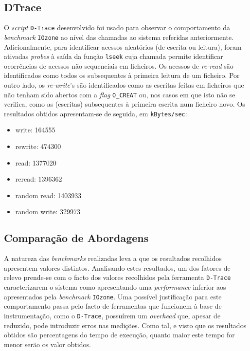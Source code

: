 \documentclass{article}
\begin{document}
\subsection{DTrace}
O \textit{script} \texttt{D-Trace} desenvolvido foi usado para observar o comportamento da \textit{benchmark} \texttt{IOzone} ao nível das chamadas
ao sistema referidas anteriormente. Adicionalmente, para identificar acessos aleatórios (de escrita ou leitura), foram ativadas \textit{probes} à
saída da função \texttt{lseek} cuja chamada permite identificar ocorrências de acessos não sequenciais em ficheiros. 
Os acessos de \textit{re-read} são identificados como todos os subsequentes à primeira leitura de um ficheiro. Por outro lado, os \textit{re-write}'s 
são identificados como as escritas feitas em ficheiros que não tenham sido abertos com a \textit{flag} \texttt{O\_CREAT} ou, nos casos em que isto não 
se verifica, como as (escritas) subsequentes à primeira escrita num ficheiro novo.
Os resultados obtidos apresentam-se de seguida, em \texttt{kBytes/sec}:
\begin{itemize}
    \item write: 164555
    \item rewrite: 474300
    \item read: 1377020
    \item reread: 1396362
    \item random read: 1403933
    \item random write: 329973
\end{itemize}


\subsection{Comparação de Abordagens}

A natureza das \textit{benchmarks} realizadas leva a que os resultados recolhidos apresentem valores distintos. 
Analisando estes resultados, um dos fatores de relevo prende-se com o facto dos valores recolhidos pela ferramenta \texttt{D-Trace} caracterizarem
o sistema como apresentando uma \textit{performance} inferior aos apresentados pela \textit{benchmark} \texttt{IOzone}. Uma possível justificação
para este comportamento passa pelo facto de ferramentas que funcionem à base de instrumentação, como o \texttt{D-Trace}, possuírem um \textit{overhead} 
que, apesar de reduzido, pode introduzir erros nas medições. Como tal, e visto que os resultados obtidos são percentagens do tempo de execução, quanto
maior este tempo for menor serão os valor obtidos. 
\end{document}
